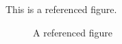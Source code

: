 This is a referenced figure. 

\begin{figure}
\caption{A referenced figure}\label{fig:is-referenced}
\end{figure}



